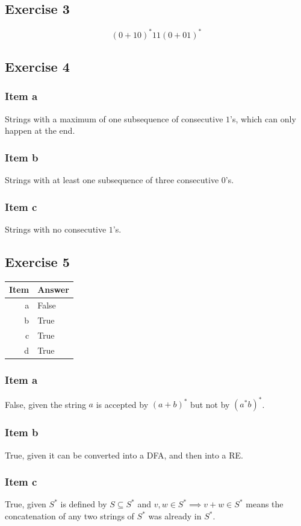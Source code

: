 {\subsection{Exercise 3}
\begin{equation*}
	(0 + 10)^* 11 (0 + 01)^*
\end{equation*}
\subsection{Exercise 4}
\subsubsection{Item a}
Strings with a maximum of one subsequence of consecutive $1$'s, which can only happen at the end.
\subsubsection{Item b}
Strings with at least one subsequence of three consecutive $0$'s.
\subsubsection{Item c}
Strings with no consecutive $1$'s.
\subsection{Exercise 5}
\begin{center} \begin{tabular}{r | l}
	\textbf{Item} & \textbf{Answer} \\ \hline
	a & False \\
	b & True \\
	c & True \\
	d & True
\end{tabular} \end{center}
\subsubsection{Item a}
False, given the string $a$ is accepted by $(a+b)^*$ but not by $(a^* b)^*$.
\subsubsection{Item b}
True, given it can be converted into a DFA, and then into a RE.
\subsubsection{Item c}
True, given $S^*$ is defined by $S \subseteq S^*$ and $v,w \in S^* \implies v+w \in S^*$ means the concatenation of any two strings of $S^*$ was already in $S^*$.
}
